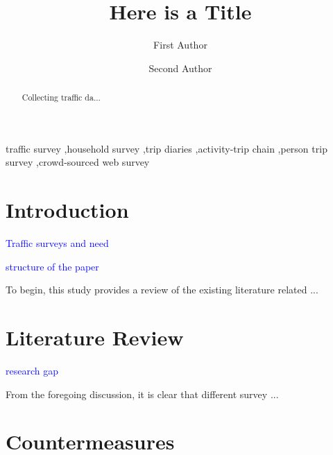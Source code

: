 \documentclass[12pt,authoryear]{elsarticle}
\def\mnote#1{\smallskip\centerline{\hfill{\sf\footnotesize\textcolor{blue}{#1}}}}
\begin{document}
	
\begin{frontmatter}
	\title{\textbf{Here is a Title}}
	
	\author{First Author}
	
	\author{Second Author}
	
	
	\address{
		Department of Civil Engineering\\
		Indian Institute of Technology (IIT) Roorkee, Roorkee-247667, India\\
	}
	
	\begin{abstract}
		Collecting traffic da...
	\end{abstract}
%
\begin{keyword}
	traffic survey \sep household survey \sep trip diaries \sep activity-trip chain \sep person trip survey \sep crowd-sourced web survey
\end{keyword}
	
\end{frontmatter}

\linenumbers

\section{Introduction} 
\label{sec:intro}
%
\mnote{Traffic surveys and need}


%
\mnote{structure of the paper} 

To begin, this study provides a review of the existing literature related \citep{Census2011Jaipur} ...




\section{Literature Review} 
\label{sec:Literature Review}


\mnote{research gap}
From the foregoing discussion, it is clear that different survey ...


\citet{Agarwal2017PhD,AgarwalEtc2019PatnaIncomeBasedCadytsCalibration}
%
\section{Countermeasures} 
\label{sec:approach}
%
\end{document}
